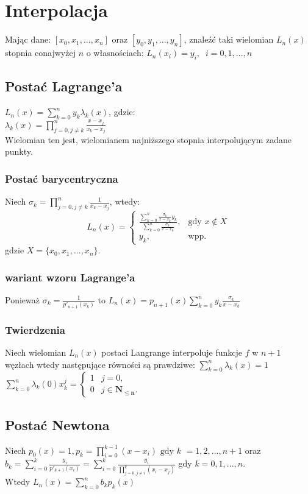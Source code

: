 \documentclass{article}
\begin{document}
\begin{minipage}[t]{.33\textwidth}
\section*{Interpolacja}
Mając dane: $[x_0,x_1,...,x_n]$ oraz $[y_0,y_1,...,y_n]$, znaleźć taki wielomian
$L_n(x)$ stopnia conajwyżej $n$ o własnościach: $L_n(x_i) = y_i, \;\; i = 0,1,...,n$
\subsection*{Postać Lagrange'a}
$L_n(x) = \sum_{k=0}^ny_k\lambda_k(x)$, gdzie: \\$\lambda_k(x) = \prod_{j=0,j\neq k}^n\frac{x-x_j}{x_k-x_j}$\\
Wielomian ten jest, wielomianem najniższego stopnia interpolującym zadane punkty.
\subsubsection*{Postać barycentryczna}
Niech $\sigma_k = \prod_{j=0,j \neq k}^n\frac{1}{x_k - x_j}$, wtedy:
\begin{equation*}
    L_n(x) = \begin{cases}
        \frac{\sum_{k=0}^n\frac{\sigma_k}{x-x_k}y_k}{\sum_{k=0}^n\frac{\sigma_k}{x-x_k}}, & \text{gdy } x \notin X\\
        y_k, & \text{wpp.}
    \end{cases}
\end{equation*}
gdzie $X = \{x_0,x_1,...,x_n\}$.
\subsubsection*{wariant wzoru Lagrange'a}
Ponieważ $\sigma_k = \frac{1}{p'_{n+1}(x_k)}$ to $L_n(x) = p_{n+1}(x)\sum_{k=0}^ny_k\frac{\sigma_k}{x-x_k}$
\subsubsection*{Twierdzenia}
Niech wielomian $L_n(x)$ postaci Langrange interpoluje funkcje $f$ w $n+1$ węzłach wtedy następujące równości są prawdziwe:
$\sum_{k=0}^n\lambda_k(x) = 1$ \\
$\sum_{k=0}^n\lambda_k(0)x^j_k = \begin{cases}
        1 & j = 0, \\
        0 & j \in \mathbf{N_{\leq n}}.
    \end{cases}$
\subsection*{Postać Newtona}
Niech $p_0(x) = 1, p_k = \prod_{i=0}^{k-1}(x-x_i) \text{ gdy } k $
$= 1,2,...,n+1$ oraz $b_k = \sum_{i=0}^k\frac{y_i}{p'_{k+1}(x_i)} = \sum_{i=0}^k\frac{y_i}{\prod_{j=0,j\neq i}^k(x_i - x_j)}$ gdy $ k = 0,1,...,n$.
\\Wtedy \color{red}$L_n(x) = \sum_{k=0}^nb_kp_k(x)$\color{black}

\end{minipage}
\end{document}
